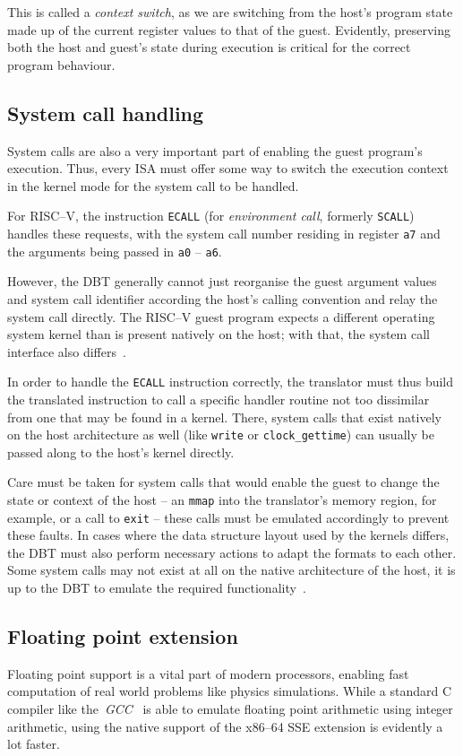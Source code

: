 This is called a \textit{context switch}, as we are switching from the host's program state made up of the current register values to that of the guest.
Evidently, preserving both the host and guest's state during execution is critical for the correct program behaviour.

\subsection{System call handling}
\label{sec:syscall-handling}
System calls are also a very important part of enabling the guest program's execution.
Thus, every ISA must offer some way to switch the execution context in the kernel mode for the system call to be handled.

For RISC--V, the instruction \texttt{ECALL} (for \textit{environment call}, formerly \texttt{SCALL}) handles these requests, with the system call number residing in register \texttt{a7} and the arguments being passed in \texttt{a0} -- \texttt{a6}.

However, the DBT generally cannot just reorganise the guest argument values and system call identifier according the host's calling convention and relay the system call directly.
The RISC--V guest program expects a different operating system kernel than is present natively on the host;
with that, the system call interface also differs~\cite[S. 2f.]{bintrans}.

In order to handle the \texttt{ECALL} instruction correctly, the translator must thus build the translated instruction to call a specific handler routine not too dissimilar from one that may be found in a kernel.
There, system calls that exist natively on the host architecture as well (like \texttt{write} or \texttt{clock\_gettime}) can usually be passed along to the host's kernel directly.

Care must be taken for system calls that would enable the guest to change the state or context of the host -- an \texttt{mmap} into the translator's memory region, for example, or a call to \texttt{exit} -- these calls must be emulated accordingly to prevent these faults.
In cases where the data structure layout used by the kernels differs, the DBT must also perform necessary actions to adapt the formats to each other.
Some system calls may not exist at all on the native architecture of the host, it is up to the DBT to emulate the required functionality~\cite[S. 2f.]{bintrans}.

\subsection{Floating point extension}
\label{subsec:fp_extension}
Floating point support is a vital part of modern processors, enabling fast computation of real world problems like physics simulations.
While a standard C compiler like the~\textit{GCC}~\cite{gcc-web} is able to emulate floating point arithmetic using integer arithmetic, using the native support of the x86--64 SSE extension is evidently a lot faster.

